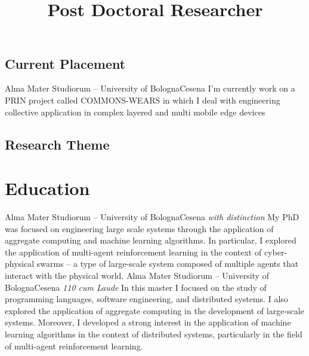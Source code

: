 \documentclass[10pt,a4paper,roman]{moderncv}        %
\title{\\Post Doctoral Researcher}
\begin{document}
\makecvtitle

\subsection{Current Placement}
%
 {Alma Mater Studiorum -- University of Bologna}{Cesena}
 {}{I'm currently work on a PRIN project called COMMONS-WEARS in which I deal with engineering collective application in complex layered and multi mobile edge devices}
\subsection{Research Theme}
\section{Education}

%
 {Alma Mater Studiorum -- University of Bologna}{Cesena}
 {\textit{with distinction}}{
 My PhD was focused on engineering large scale systems through the application of aggregate computing and machine learning algorithms. In particular, I explored the application of multi-agent reinforcement learning in the context of cyber-physical swarms -- a type of large-scale system composed of multiple agents that interact with the physical world.
 }
%
 {Alma Mater Studiorum -- University of Bologna}{Cesena}
 {\textit{110 cum Laude}}{
  In this master I focused on the study of programming languages, software engineering, and distributed systems. I also explored the application of aggregate computing in the development of large-scale systems.
  Moreover, I developed a strong interest in the application of machine learning algorithms in the context of distributed systems, particularly in the field of multi-agent reinforcement learning.
 }
\end{document}

